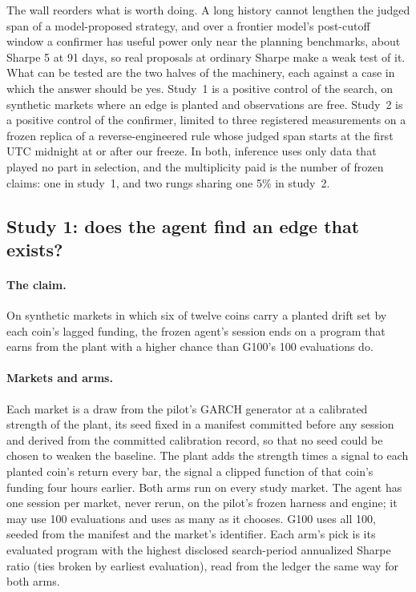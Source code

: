 \documentclass[11pt]{article}
\begin{document}
The wall reorders what is worth doing. A long history cannot lengthen the judged span of a model-proposed strategy, and over a frontier model's post-cutoff window a confirmer has useful power only near the planning benchmarks, about Sharpe 5 at 91 days, so real proposals at ordinary Sharpe make a weak test of it. What can be tested are the two halves of the machinery, each against a case in which the answer should be yes. Study~1 is a positive control of the search, on synthetic markets where an edge is planted and observations are free. Study~2 is a positive control of the confirmer, limited to three registered measurements on a frozen replica of a reverse-engineered rule whose judged span starts at the first UTC midnight at or after our freeze. In both, inference uses only data that played no part in selection, and the multiplicity paid is the number of frozen claims: one in study~1, and two rungs sharing one 5\% in study~2.

\subsection{Study 1: does the agent find an edge that exists?}\label{sec:study1}

\paragraph{The claim.} On synthetic markets in which six of twelve coins carry a planted drift set by each coin's lagged funding, the frozen agent's session ends on a program that earns from the plant with a higher chance than G100's 100 evaluations do.

\paragraph{Markets and arms.} Each market is a draw from the pilot's GARCH generator at a calibrated strength of the plant, its seed fixed in a manifest committed before any session and derived from the committed calibration record, so that no seed could be chosen to weaken the baseline. The plant adds the strength times a signal to each planted coin's return every bar, the signal a clipped function of that coin's funding four hours earlier. Both arms run on every study market. The agent has one session per market, never rerun, on the pilot's frozen harness and engine; it may use 100 evaluations and uses as many as it chooses. G100 uses all 100, seeded from the manifest and the market's identifier. Each arm's pick is its evaluated program with the highest disclosed search-period annualized Sharpe ratio (ties broken by earliest evaluation), read from the ledger the same way for both arms.
\end{document}
